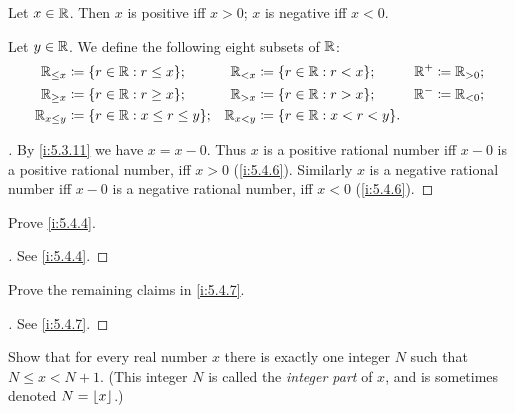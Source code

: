 \begin{ac}\label{i:ac:5.4.3}
  Let \(x \in \mathbb{R}\).
  Then \(x\) is positive iff \(x > 0\);
  \(x\) is negative iff \(x < 0\).

  Let \(y \in \mathbb{R}\).
  We define the following eight subsets of \(\mathbb{R}\):
  \begin{align*}
    \R_{\leq x}   & \coloneqq \set{r \in \R : r \leq x};        & \R_{< x}   & \coloneqq \set{r \in \R : r < x};     & \R^+ & \coloneqq \R_{> 0}; \\
    \R_{\geq x}   & \coloneqq \set{r \in \R : r \geq x};        & \R_{> x}   & \coloneqq \set{r \in \R : r > x};     & \R^- & \coloneqq \R_{< 0}; \\
    \R_{x \leq y} & \coloneqq \set{r \in \R : x \leq r \leq y}; & \R_{x < y} & \coloneqq \set{r \in \R : x < r < y}. &      &
  \end{align*}
\end{ac}

\begin{proof}[]
  By \cref{i:5.3.11} we have \(x = x - 0\).
  Thus \(x\) is a positive rational number iff \(x - 0\) is a positive rational number, iff \(x > 0\) (\cref{i:5.4.6}).
  Similarly \(x\) is a negative rational number iff \(x - 0\) is a negative rational number, iff \(x < 0\) (\cref{i:5.4.6}).
\end{proof}

\exercisesection

\begin{ex}\label{i:ex:5.4.1}
  Prove \cref{i:5.4.4}.
\end{ex}

\begin{proof}[]
  See \cref{i:5.4.4}.
\end{proof}

\begin{ex}\label{i:ex:5.4.2}
  Prove the remaining claims in \cref{i:5.4.7}.
\end{ex}

\begin{proof}[]
  See \cref{i:5.4.7}.
\end{proof}

\begin{ex}\label{i:ex:5.4.3}
  Show that for every real number \(x\) there is exactly one integer \(N\) such that \(N \leq x < N + 1\).
  (This integer \(N\) is called the \emph{integer part} of \(x\), and is sometimes denoted \(N = \left\lfloor x\right\rfloor\).)
\end{ex}

